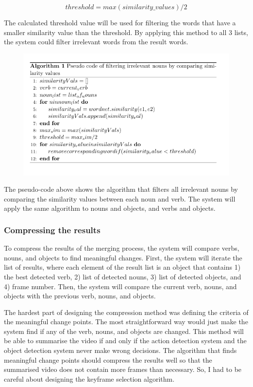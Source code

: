 \documentclass{article}
\begin{document}
\[threshold = max(similarity\_values) / 2\]

The calculated threshold value will be used for filtering the words that have a smaller similarity value than the threshold. By applying this method to all 3 lists, the system could filter irrelevant words from the result words.

\begin{figure}[H]
    \centering
    \includegraphics[scale=1]{imgs/pseudo_code.png}
    \label{fig:pseudocode_merging}
\end{figure}

The pseudo-code above shows the algorithm that filters all irrelevant nouns by comparing the similarity values between each noun and verb. The system will apply the same algorithm to nouns and objects, and verbs and objects.

\subsubsection{Compressing the results}

To compress the results of the merging process, the system will compare verbs, nouns, and objects to find meaningful changes. First, the system will iterate the list of results, where each element of the result list is an object that contains 1) the best detected verb, 2) list of detected nouns, 3) list of detected objects, and 4) frame number. Then, the system will compare the current verb, nouns, and objects with the previous verb, nouns, and objects.

The hardest part of designing the compression method was defining the criteria of the meaningful change points. The most straightforward way would just make the system find if any of the verb, nouns, and objects are changed. This method will be able to summarise the video if and only if the action detection system and the object detection system never make wrong decisions. The algorithm that finds meaningful change points should compress the results well so that the summarised video does not contain more frames than necessary. So, I had to be careful about designing the keyframe selection algorithm.
\end{document}
